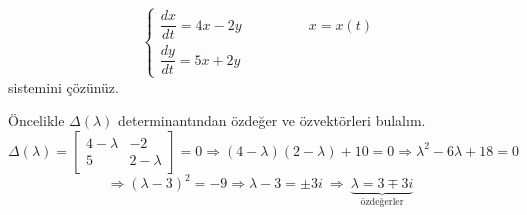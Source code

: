 \documentclass[11pt,a4paper]{article}
\begin{document}
\begin{ornek}[4]
\[
\begin{cases} \dfrac{dx}{dt} = 4x - 2y & \qquad\qquad x = x(t) \\[3mm] \dfrac{dy}{dt} = 5x + 2y & \end{cases}
\]
sistemini çözünüz.
\end{ornek}
\begin{cozum}
Öncelikle $\Delta(\lambda)$ determinantından özdeğer ve özvektörleri bulalım.
\[
\Delta(\lambda) = \begin{bmatrix} 4-\lambda & -2 \\ 5 & 2-\lambda \end{bmatrix} = 0 \Rightarrow (4-\lambda)(2-\lambda) + 10 = 0 \Rightarrow \lambda^2 - 6\lambda + 18 = 0
\]
\[
\Rightarrow (\lambda-3)^2 = -9 \Rightarrow \lambda - 3 = \pm 3i \ \Rightarrow \ \underbrace{\lambda = 3 \mp 3i}_{\text{özdeğerler}}
\]


\end{cozum}
\end{document}
